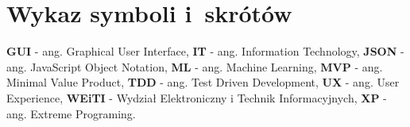 \chapter*{Wykaz symboli i~skrótów}

\noindent
\textbf{GUI} - ang. Graphical User Interface, \newline
\textbf{IT} - ang. Information Technology, \newline
\textbf{JSON} - ang. JavaScript Object Notation, \newline
\textbf{ML} - ang. Machine Learning, \newline
\textbf{MVP} - ang. Minimal Value Product, \newline
\textbf{TDD} - ang. Test Driven Development, \newline
\textbf{UX} - ang. User Experience, \newline
\textbf{WEiTI} - Wydział Elektroniczny i Technik Informacyjnych, \newline
\textbf{XP} - ang. Extreme Programing. \newline

\cleardoublepage